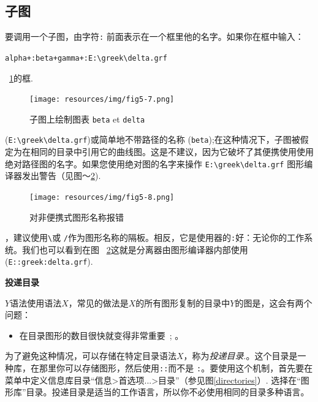 

\subsection{子图}
\label{section-subgraphs}
\index{\verb+:+}
要调用一个子图，由字符\verb+:+ 前面表示在一个框里他的名字。如果你在框中输入：

\medskip
\verb$alpha+:beta+gamma+:E:\greek\delta.grf$

\medskip
{}~\ref{fig-subgraph-call}的框.

\begin{figure}[h]
\begin{center}
\texttt{[image: resources/img/fig5-7.png]}
\caption{子图上绘制图表 \texttt{beta} et
\texttt{delta}\label{fig-subgraph-call}}
\end{center}
\end{figure}

(\verb$E:\greek\delta.grf$)或简单地不带路径的名称
 (\verb$beta$);在这种情况下，子图被假定为在相同的目录中引用它的曲线图。这是不建议，因为它破坏了其便携使用使用绝对路径图的名字。如果您使用绝对图的名字来操作 \verb+E:\greek\delta.grf+ 图形编译器发出警告（见图〜\ref{fig-warning-absolute-graph-name}).

\begin{figure}[!h]
\begin{center}
\texttt{[image: resources/img/fig5-8.png]}
\caption{对非便携式图形名称报错\label{fig-warning-absolute-graph-name}}
\end{center}
\end{figure}

\bigskip
{}，建议使用\verb+\+或 \verb+/+作为图形名称的隔板。相反，它是使用器的\verb+:+好：无论你的工作系统。我们也可以看到在图
~\ref{fig-warning-absolute-graph-name}这就是分离器由图形编译器内部使用(\verb+E::greek:delta.grf+).

\bigskip
\noindent \textbf{投递目录}
\label{section-repository}

\bigskip
{}$Y$语法使用语法$X$，常见的做法是$X$的所有图形复制的目录中$ Y$的图是，这会有两个问题：

\begin{itemize}
  \item 在目录图形的数目很快就变得非常重要~;
  。
\end{itemize}

\noindent 为了避免这种情况，可以存储在特定目录语法$ X $，称为\textit{投递目录}.。这个目录是一种库，在那里你可以存储图形，然后使用\verb+::+而不是 \verb+:+。要使用这个机制，首先要在菜单中定义信息库目录“信息>首选项...>目录”（参见图\ref{directories}）.
选择在“图形库”目录。投递目录是适当的工作语言，所以你不必使用相同的目录多种语言。

